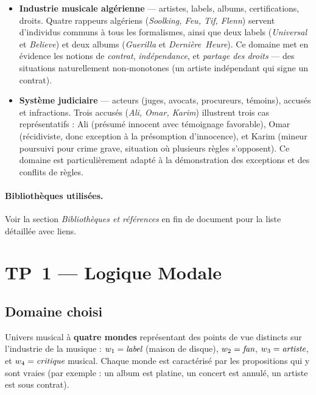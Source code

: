 \documentclass[11pt, a4paper]{article}
\begin{document}
\begin{itemize}
  \item \textbf{Industrie musicale algérienne} --- artistes, labels, albums,
        certifications, droits. Quatre rappeurs algériens (\emph{Soolking,
        Feu, Tif, Flenn}) servent d'individus communs à tous les formalismes,
        ainsi que deux labels (\emph{Universal} et \emph{Believe}) et deux
        albums (\emph{Guerilla} et \emph{Dernière~Heure}). Ce domaine met en
        évidence les notions de \emph{contrat}, \emph{indépendance}, et
        \emph{partage des droits} --- des situations naturellement non-monotones
        (un artiste indépendant qui signe un contrat).

  \item \textbf{Système judiciaire} --- acteurs (juges, avocats, procureurs,
        témoins), accusés et infractions. Trois accusés (\emph{Ali, Omar,
        Karim}) illustrent trois cas représentatifs : Ali (présumé innocent
        avec témoignage favorable), Omar (récidiviste, donc exception à la
        présomption d'innocence), et Karim (mineur poursuivi pour crime grave,
        situation où plusieurs règles s'opposent). Ce domaine est
        particulièrement adapté à la démonstration des exceptions et des
        conflits de règles.
\end{itemize}

\paragraph{Bibliothèques utilisées.} Voir la section
\emph{Bibliothèques et références} en fin de document pour la liste détaillée
avec liens.

\newpage
\section{TP~1 --- Logique Modale}

\subsection*{Domaine choisi}

Univers musical à \textbf{quatre mondes} représentant des points de vue
distincts sur l'industrie de la musique : $w_1 = \emph{label}$
(maison de disque), $w_2 = \emph{fan}$, $w_3 = \emph{artiste}$, et
$w_4 = \emph{critique}$ musical. Chaque monde est caractérisé par les
propositions qui y sont vraies (par exemple : un album est platine, un
concert est annulé, un artiste est sous contrat).
\end{document}

